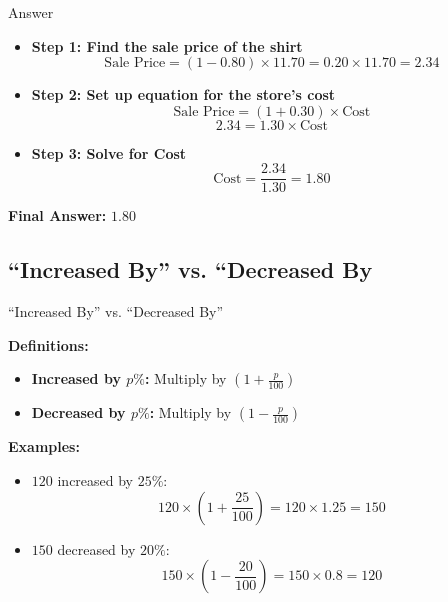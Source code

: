 \documentclass{beamer}
\begin{document}
\begin{frame}{{Answer}}
    \begin{itemize}
        \item \textbf{Step 1: Find the sale price of the shirt}
        \[
        \text{Sale Price} = (1 - 0.80) \times 11.70 = 0.20 \times 11.70 = 2.34
        \]
        \item \textbf{Step 2: Set up equation for the store’s cost}
        \[
        \text{Sale Price} = (1 + 0.30) \times \text{Cost}
        \]
        \[
        2.34 = 1.30 \times \text{Cost}
        \]
        \item \textbf{Step 3: Solve for Cost}
        \[
        \text{Cost} = \frac{2.34}{1.30} = 1.80
        \]
    \end{itemize}

    \textbf{Final Answer:} \( \mathbf{1.80} \)
\end{frame}
\begin{frame}
\section{“Increased By” vs. “Decreased By}
\end{frame}
\begin{frame}{ ``Increased By'' vs. ``Decreased By''}
\small

\textbf{Definitions:}
\begin{itemize}
    \item \textbf{Increased by $p\%$:} Multiply by $\left(1 + \frac{p}{100}\right)$
    \item \textbf{Decreased by $p\%$:} Multiply by $\left(1 - \frac{p}{100}\right)$
\end{itemize}

\textbf{Examples:}
\begin{itemize}
    \item $120$ increased by $25\%$: 
    \[
    120 \times \left(1 + \frac{25}{100}\right) = 120 \times 1.25 = 150
    \]
    \item $150$ decreased by $20\%$: 
    \[
    150 \times \left(1 - \frac{20}{100}\right) = 150 \times 0.8 = 120
    \]
\end{itemize}

\end{frame}
\end{document}

